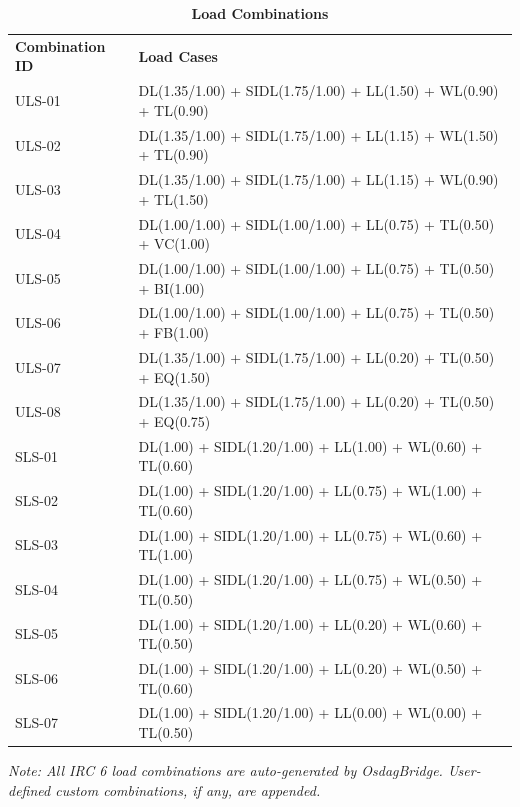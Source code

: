 \documentclass[12pt,a4paper]{report}
\numberwithin{table}{chapter}
\numberwithin{figure}{chapter}
\begin{document}
\vspace{1em}
\begin{longtable}{|C{4.0cm}|p{11.5cm}|}
\caption{\textbf{Load Combinations}} \\
\hline
\endfirsthead
\hline
\caption{\textbf{Load Combinations}} \\
\hline
\endhead
\textbf{Combination ID} & \textbf{Load Cases} \\[6pt]
\hline
ULS-01 & DL(1.35/1.00) + SIDL(1.75/1.00) + LL(1.50) + WL(0.90) + TL(0.90) \\[6pt]
\hline
ULS-02 & DL(1.35/1.00) + SIDL(1.75/1.00) + LL(1.15) + WL(1.50) + TL(0.90) \\[6pt]
\hline
ULS-03 & DL(1.35/1.00) + SIDL(1.75/1.00) + LL(1.15) + WL(0.90) + TL(1.50) \\[6pt]
\hline
ULS-04 & DL(1.00/1.00) + SIDL(1.00/1.00) + LL(0.75) + TL(0.50) + VC(1.00) \\[6pt]
\hline
ULS-05 & DL(1.00/1.00) + SIDL(1.00/1.00) + LL(0.75) + TL(0.50) + BI(1.00) \\[6pt]
\hline
ULS-06 & DL(1.00/1.00) + SIDL(1.00/1.00) + LL(0.75) + TL(0.50) + FB(1.00) \\[6pt]
\hline
ULS-07 & DL(1.35/1.00) + SIDL(1.75/1.00) + LL(0.20) + TL(0.50) + EQ(1.50) \\[6pt]
\hline
ULS-08 & DL(1.35/1.00) + SIDL(1.75/1.00) + LL(0.20) + TL(0.50) + EQ(0.75) \\[6pt]
\hline
SLS-01 & DL(1.00) + SIDL(1.20/1.00) + LL(1.00) + WL(0.60) + TL(0.60) \\[6pt]
\hline
SLS-02 & DL(1.00) + SIDL(1.20/1.00) + LL(0.75) + WL(1.00) + TL(0.60) \\[6pt]
\hline
SLS-03 & DL(1.00) + SIDL(1.20/1.00) + LL(0.75) + WL(0.60) + TL(1.00) \\[6pt]
\hline
SLS-04 & DL(1.00) + SIDL(1.20/1.00) + LL(0.75) + WL(0.50) + TL(0.50) \\[6pt]
\hline
SLS-05 & DL(1.00) + SIDL(1.20/1.00) + LL(0.20) + WL(0.60) + TL(0.50) \\[6pt]
\hline
SLS-06 & DL(1.00) + SIDL(1.20/1.00) + LL(0.20) + WL(0.50) + TL(0.60) \\[6pt]
\hline
SLS-07 & DL(1.00) + SIDL(1.20/1.00) + LL(0.00) + WL(0.00) + TL(0.50) \\[6pt]
\hline
\end{longtable}

\noindent\textit{Note: All IRC 6 load combinations are auto-generated by OsdagBridge. User-defined custom combinations, if any, are appended.}
\end{document}
